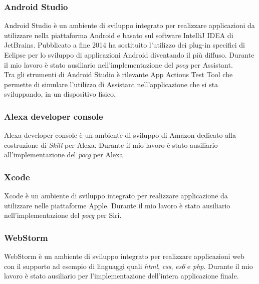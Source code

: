 		\subsubsection{Android Studio}
		Android Studio è un ambiente di sviluppo integrato per realizzare applicazioni da utilizzare nella piattaforma Android e basato sul software IntelliJ IDEA di JetBrains. Pubblicato a fine 2014 ha sostituito l'utilizzo dei plug-in specifici di Eclipse per lo sviluppo di applicazioni Android diventando il più diffuso. Durante il mio lavoro è stato ausiliario nell'implementazione del \emph{\gls{pocg}} per Assistant. \\
		Tra gli strumenti di Android Studio è rilevante App Actions Test Tool che permette di simulare l'utilizzo di Assistant nell'applicazione che si sta sviluppando, in un dispositivo fisico.
		\subsubsection{Alexa developer console}
		Alexa developer console è un ambiente di sviluppo di Amazon dedicato alla costruzione di \emph{Skill} per Alexa. Durante il mio lavoro è stato ausiliario all'implementazione del \emph{\gls{pocg}} per Alexa
		\subsubsection{Xcode}
		Xcode è un ambiente di sviluppo integrato per realizzare applicazione da utilizzare nelle piattaforme Apple. Durante il mio lavoro è stato ausiliario nell'implementazione del \emph{\gls{pocg}} per Siri.
		\subsubsection{WebStorm}
		WebStorm è un ambiente di sviluppo integrato per realizzare applicazioni web con il supporto ad esempio di linguaggi quali \emph{\gls{html}}, \emph{\gls{css}}, \emph{\gls{es6}} e \emph{\gls{php}}\glsfirstoccur. Durante il mio lavoro è stato ausiliario per l'implementazione dell'intera applicazione finale.

